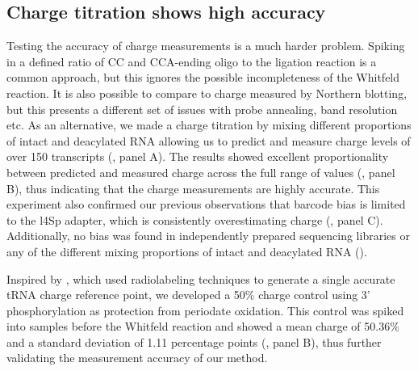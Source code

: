 \documentclass[9pt,lineno]{elife}
\begin{document}
\begin{figure}[ht!]
\end{figure}
\label{figsupp:f4S2}




\subsection{Charge titration shows high accuracy}
Testing the accuracy of charge measurements is a much harder problem.
Spiking in a defined ratio of CC and CCA-ending oligo to the ligation reaction is a common approach, but this ignores the possible incompleteness of the Whitfeld reaction.
It is also possible to compare to charge measured by Northern blotting, but this presents a different set of issues with probe annealing, band resolution etc.
As an alternative, we made a charge titration by mixing different proportions of intact and deacylated RNA allowing us to predict and measure charge levels of over 150 transcripts (, panel A).
The results showed excellent proportionality between predicted and measured charge across the full range of values (, panel B), thus indicating that the charge measurements are highly accurate.
This experiment also confirmed our previous observations that barcode bias is limited to the l4Sp adapter, which is consistently overestimating charge (, panel C).
Additionally, no bias was found in independently prepared sequencing libraries or any of the different mixing proportions of intact and deacylated RNA ().

Inspired by \cite{Evans2017-st}, which used radiolabeling techniques to generate a single accurate tRNA charge reference point, we developed a 50\% charge control using 3’ phosphorylation as protection from periodate oxidation.
This control was spiked into samples before the Whitfeld reaction and showed a mean charge of 50.36\% and a standard deviation of 1.11 percentage points (, panel B), thus further validating the measurement accuracy of our method.
\end{document}
